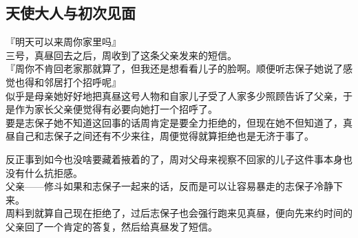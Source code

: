 \subsection{天使大人与初次见面}

『明天可以来周你家里吗』\\

三号，真昼回去之后，周收到了这条父亲发来的短信。\\

『周你不肯回老家那就算了，但我还是想看看儿子的脸啊。顺便听志保子她说了感觉也得和邻居打个招呼呢』 \\

似乎是母亲她好好地把真昼这号人物和自家儿子受了人家多少照顾告诉了父亲，于是作为家长父亲便觉得有必要向她打一个招呼了。\\

要是志保子她不知道这回事的话周肯定是要全力拒绝的，但现在她不但知道了，真昼自己和志保子之间还有不少来往，周便觉得就算拒绝也是无济于事了。

反正事到如今也没啥要藏着掖着的了，周对父母来视察不回家的儿子这件事本身也没有什么抗拒感。\\

父亲——修斗如果和志保子一起来的话，反而是可以让容易暴走的志保子冷静下来。\\

周料到就算自己现在拒绝了，过后志保子也会强行跑来见真昼，便向先来约时间的父亲回了一个肯定的答复，然后给真昼发了短信。\\

